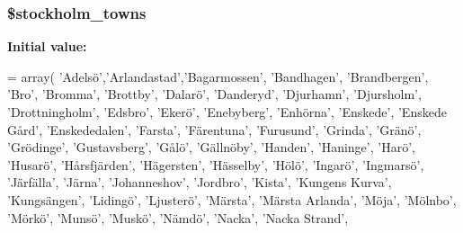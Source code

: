 \subsubsection[{\$stockholm\+\_\+towns}]{\setlength{\rightskip}{0pt plus 5cm}\$stockholm\+\_\+towns}\label{veganistan_8php_aa87fd4a07e43c737def4add38fe29880}
{\bfseries Initial value\+:}
\begin{DoxyCode}
= array(
      \textcolor{stringliteral}{'Adelsö'},\textcolor{stringliteral}{'Arlandastad'},\textcolor{stringliteral}{'Bagarmossen'}, \textcolor{stringliteral}{'Bandhagen'}, \textcolor{stringliteral}{'Brandbergen'}, \textcolor{stringliteral}{'Bro'}, \textcolor{stringliteral}{'Bromma'},
      \textcolor{stringliteral}{'Brottby'}, \textcolor{stringliteral}{'Dalarö'}, \textcolor{stringliteral}{'Danderyd'}, \textcolor{stringliteral}{'Djurhamn'}, \textcolor{stringliteral}{'Djursholm'}, \textcolor{stringliteral}{'Drottningholm'}, \textcolor{stringliteral}{'Edsbro'},
      \textcolor{stringliteral}{'Ekerö'}, \textcolor{stringliteral}{'Enebyberg'}, \textcolor{stringliteral}{'Enhörna'}, \textcolor{stringliteral}{'Enskede'}, \textcolor{stringliteral}{'Enskede Gård'}, \textcolor{stringliteral}{'Enskededalen'}, \textcolor{stringliteral}{'Farsta'},
      \textcolor{stringliteral}{'Färentuna'}, \textcolor{stringliteral}{'Furusund'}, \textcolor{stringliteral}{'Grinda'}, \textcolor{stringliteral}{'Gränö'}, \textcolor{stringliteral}{'Grödinge'}, \textcolor{stringliteral}{'Gustavsberg'}, \textcolor{stringliteral}{'Gålö'}, \textcolor{stringliteral}{'Gällnöby'},
      \textcolor{stringliteral}{'Handen'}, \textcolor{stringliteral}{'Haninge'}, \textcolor{stringliteral}{'Harö'}, \textcolor{stringliteral}{'Husarö'}, \textcolor{stringliteral}{'Hårsfjärden'}, \textcolor{stringliteral}{'Hägersten'}, \textcolor{stringliteral}{'Hässelby'}, \textcolor{stringliteral}{'Hölö'},
      \textcolor{stringliteral}{'Ingarö'}, \textcolor{stringliteral}{'Ingmarsö'}, \textcolor{stringliteral}{'Järfälla'}, \textcolor{stringliteral}{'Järna'}, \textcolor{stringliteral}{'Johanneshov'}, \textcolor{stringliteral}{'Jordbro'}, \textcolor{stringliteral}{'Kista'},
      \textcolor{stringliteral}{'Kungens Kurva'}, \textcolor{stringliteral}{'Kungsängen'}, \textcolor{stringliteral}{'Lidingö'}, \textcolor{stringliteral}{'Ljusterö'}, \textcolor{stringliteral}{'Märsta'}, \textcolor{stringliteral}{'Märsta Arlanda'},
      \textcolor{stringliteral}{'Möja'}, \textcolor{stringliteral}{'Mölnbo'}, \textcolor{stringliteral}{'Mörkö'}, \textcolor{stringliteral}{'Munsö'}, \textcolor{stringliteral}{'Muskö'}, \textcolor{stringliteral}{'Nämdö'}, \textcolor{stringliteral}{'Nacka'}, \textcolor{stringliteral}{'Nacka Strand'},

\end{DoxyCode}
